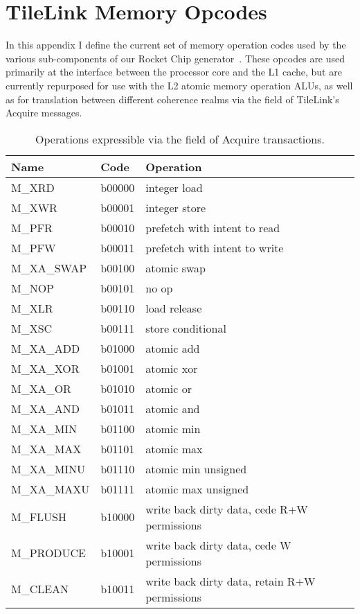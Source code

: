 \chapter{TileLink Memory Opcodes}
\label{a.memopcodes}

In this appendix I define the current set of memory operation codes used by
the various sub-components of our Rocket Chip generator~\cite{rocket}.
These opcodes are used primarily at the interface between the processor core and the L1 cache,
but are currently repurposed for use with the L2 atomic memory operation ALUs,
as well as for translation between different coherence realms via the  field
of TileLink's Acquire messages.

\begin{table}
\centering
\begin{tabular}{|l|l|l|}
\hline
Name  & Code & Operation \\ \hline \hline
M\_XRD      & b00000 & integer load \\ \hline 
M\_XWR      & b00001 & integer store \\ \hline 
M\_PFR      & b00010 & prefetch with intent to read \\ \hline 
M\_PFW      & b00011 & prefetch with intent to write \\ \hline 
M\_XA\_SWAP & b00100 & atomic swap \\ \hline 
M\_NOP      & b00101 & no op \\ \hline 
M\_XLR      & b00110 & load release \\ \hline 
M\_XSC      & b00111 & store conditional \\ \hline 
M\_XA\_ADD  & b01000 & atomic add \\ \hline 
M\_XA\_XOR  & b01001 & atomic xor \\ \hline 
M\_XA\_OR   & b01010 & atomic or \\ \hline 
M\_XA\_AND  & b01011 & atomic and \\ \hline 
M\_XA\_MIN  & b01100 & atomic min \\ \hline 
M\_XA\_MAX  & b01101 & atomic max \\ \hline 
M\_XA\_MINU & b01110 & atomic min unsigned \\ \hline 
M\_XA\_MAXU & b01111 & atomic max unsigned \\ \hline 
M\_FLUSH    & b10000 & write back dirty data, cede R+W permissions \\ \hline 
M\_PRODUCE  & b10001 & write back dirty data, cede W permissions \\ \hline 
M\_CLEAN    & b10011 & write back dirty data, retain R+W permissions \\ \hline
\end{tabular}
\caption{Operations expressible via the  field of Acquire transactions.}
\label{tab:opcodes}
\end{table}

